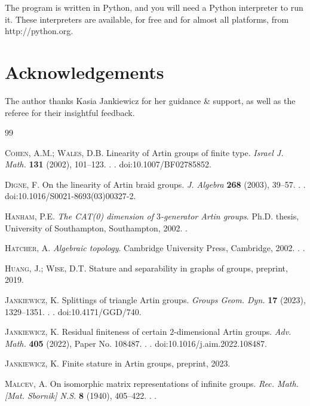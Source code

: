 \documentclass[11pt,hyp,]{nyjm}
\theoremstyle{definition}
\begin{document}
The program is written in Python, and you
will need a Python interpreter to run it. These interpreters are available, for free and for almost all platforms,
from http://python.org.


\section{Acknowledgements}
The author thanks Kasia Jankiewicz for her guidance \& support, as well as the referee for their insightful feedback.


\begin{thebibliography}{99}

{\scshape Cohen, A.M.; Wales, D.B.}
Linearity of Artin groups of finite type.
{\em Israel J. Math.} {\bf 131} (2002), 101--123.
.
.
doi:10.1007/BF02785852.

{\scshape Digne, F.}
On the linearity of Artin braid groups.
{\em J. Algebra} {\bf 268} (2003), 39--57.
.
.
doi:10.1016/S0021-8693(03)00327-2.

{\scshape Hanham, P.E.}
{\em The CAT(0) dimension of $3$-generator Artin groups}.
Ph.D. thesis, University of Southampton, Southampton, 2002.
.

{\scshape Hatcher, A.}
{\em Algebraic topology}.
Cambridge University Press, Cambridge, 2002.
.
.

{\scshape Huang, J.; Wise, D.T.}
Stature and separability in graphs of groups, preprint, 2019.

{\scshape Jankiewicz, K.}
Splittings of triangle Artin groups.
{\em Groups Geom. Dyn.} {\bf 17} (2023), 1329--1351.
.
.
doi:10.4171/GGD/740.

{\scshape Jankiewicz, K.}
Residual finiteness of certain $2$-dimensional Artin groups.
{\em Adv. Math.} {\bf 405} (2022), Paper No. 108487.
.
.
doi:10.1016/j.aim.2022.108487.

{\scshape Jankiewicz, K.}
Finite stature in Artin groups, preprint, 2023.

{\scshape Malcev, A.}
On isomorphic matrix representations of infinite groups.
{\em Rec. Math. [Mat. Sbornik] N.S.} {\bf 8} (1940), 405--422.
.
.


\end{thebibliography}
\end{document}
